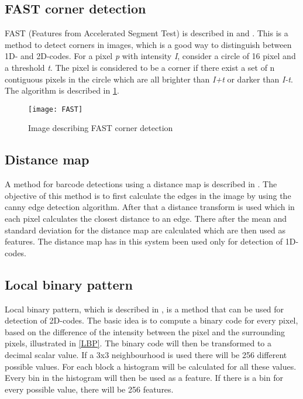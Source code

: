 \subsection{FAST corner detection}
\label{sec:FAST corner detection}
FAST (Features from Accelerated Segment Test) is described in \citep{Rosten:2006} and \citep{Rosten:2005}. This is a method to detect corners in images, which is a good way to distinguish between 1D- and 2D-codes. For a pixel \textit{p} with intensity \textit{I}, consider a circle of 16 pixel and a threshold \textit{t}. The pixel is considered to be a corner if there exist a set of n contiguous pixels in the circle which are all brighter than \textit{I+t} or darker than \textit{I-t}. The algorithm is described in \ref{FAST}.

\begin{figure}[H]
\centering
	\texttt{[image: FAST]}
	\caption{Image describing FAST corner detection}
	\label{FAST}
\end{figure}

\subsection{Distance map}
\label{sec:Distance map}
A method for barcode detections using a distance map is described in \citep{Bodnar}. The objective of this method is to first calculate the edges in the image by using the canny edge detection algorithm. After that a distance transform is used which in each pixel calculates the closest distance to an edge. There after the mean and standard deviation for the distance map are calculated which are then used as features. The distance map has in this system been used only for detection of 1D-codes.
 
\subsection{Local binary pattern}
\label{sec:Local binary pattern}
Local binary pattern, which is described in \citep{Pietikainen:2010}, is a method that can be used for detection of 2D-codes. The basic idea is to compute a binary code for every pixel, based on the difference of the intensity between the pixel and the surrounding pixels, illustrated in \ref{LBP}. The binary code will then be transformed to a decimal scalar value. If a 3x3 neighbourhood is used there will be 256 different possible values. For each block a histogram will be calculated for all these values. Every bin in the histogram will then be used as a feature. If there is a bin for every possible value, there will be 256 features.

